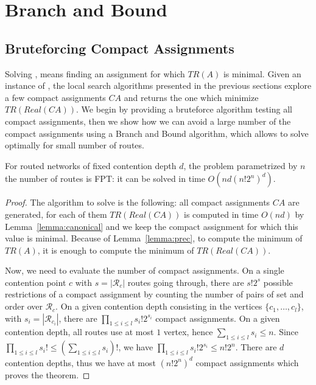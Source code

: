 

\section{Branch and Bound}


\subsection{Bruteforcing Compact Assignments}

Solving \minstra, means finding an assignment for which $TR(A)$ is minimal. 
Given an instance of \minstra, the local search algorithms presented in the previous sections explore a few compact assignments $CA$ and returns the one which minimize $TR(Real(CA))$.  We begin by providing 
a bruteforce algorithm testing all compact assignments, then we show how we can avoid a large number of the compact assignments using a Branch and Bound algorithm, which allows to solve \minstra optimally for small number of routes.

\begin{theorem}\label{theorem:FPT}
For routed networks of fixed contention depth $d$, the problem \minstra parametrized by $n$ the number of routes is FPT: it can be solved in time $O(nd(n!2^{n})^{d})$.
\end{theorem}
\begin{proof}
The algorithm to solve \minstra is the following: all compact assignments $CA$ are generated, for each of them $TR(Real(CA))$ is computed in time $O(nd)$ by Lemma~\ref{lemma:canonical} and we keep the compact assignment for which this value is minimal.  Because of Lemma~\ref{lemma:prec}, to compute the minimum of $TR(A)$, it is enough 
to compute the minimum of $TR(Real(CA))$.

 Now, we need to evaluate the number of compact assignments. 
On a single contention point $c$ with $s = |\mathcal{R}_c|$ routes going through, there are $s!2^s$ possible restrictions of a compact assignment by counting the number of pairs of set and order over $\mathcal{R}_c$.
On a given contention depth consisting in the vertices $\{c_1,\dots,c_l\}$, with $s_i = |\mathcal{R}_{c_{i}}|$, there are 
$\prod_{1 \leq i\leq l} s_i!2^{s_i}$ compact assignments. On a given contention depth, all routes use at most $1$ vertex, hence $\sum_{1 \leq i\leq l} s_i \leq n$. Since $\prod_{1 \leq i\leq l} s_i! \leq (\sum_{1 \leq i\leq l} s_i)!$, we have $\prod_{1 \leq i\leq l} s_i!2^{s_i} \leq n!2^n$. There are $d$ contention depths, thus we have at most $ (n!2^{n})^{d}$ compact assignments which proves the theorem.
\end{proof}


